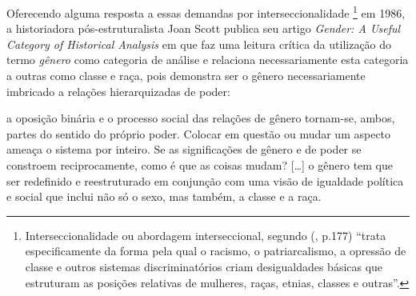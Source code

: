 
Oferecendo alguma resposta a essas demandas por interseccionalidade
\footnote{Interseccionalidade ou abordagem interseccional, segundo  (\citeyear{CRENSHAW2002}, p.177) ``trata especificamente da forma pela qual o racismo, o patriarcalismo, a opressão de classe e outros sistemas discriminatórios criam desigualdades básicas que estruturam as posições relativas de mulheres, raças, etnias, classes e outras''.} em 1986, a historiadora pós-estruturalista Joan Scott publica seu artigo \emph{Gender: A Useful Category of Historical Analysis} em que faz uma leitura crítica da utilização do termo \emph{gênero} como categoria de análise e relaciona necessariamente esta categoria a outras como classe e raça, pois demonstra ser o gênero necessariamente imbricado a relações hierarquizadas de poder:

\begin{citacao}
a oposição binária e o processo social das relações de gênero tornam-se,
ambos, partes do sentido do próprio poder. Colocar em questão ou mudar um aspecto ameaça o sistema por inteiro. Se as significações de gênero e de poder se constroem reciprocamente, como é que as coisas mudam? [\ldots] o gênero tem que ser redefinido e reestruturado em conjunção com uma visão de igualdade política e social que inclui não só o sexo, mas também, a classe e a raça. \cite[p.1073,1075]{SCOTT1986}
\end{citacao}


